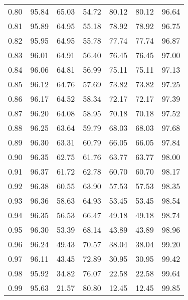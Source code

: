 \begin{tabular}{|c|c|c|c|c|c|c|}
      0.80 &     95.84 &     65.03 &      54.72 &   80.12 &      80.12 &         96.64 \\
      0.81 &     95.89 &     64.95 &      55.18 &   78.92 &      78.92 &         96.75 \\
      0.82 &     95.95 &     64.95 &      55.78 &   77.74 &      77.74 &         96.87 \\
      0.83 &     96.01 &     64.91 &      56.40 &   76.45 &      76.45 &         97.00 \\
      0.84 &     96.06 &     64.81 &      56.99 &   75.11 &      75.11 &         97.13 \\
      0.85 &     96.12 &     64.76 &      57.69 &   73.82 &      73.82 &         97.25 \\
      0.86 &     96.17 &     64.52 &      58.34 &   72.17 &      72.17 &         97.39 \\
      0.87 &     96.20 &     64.08 &      58.95 &   70.18 &      70.18 &         97.52 \\
      0.88 &     96.25 &     63.64 &      59.79 &   68.03 &      68.03 &         97.68 \\
      0.89 &     96.30 &     63.31 &      60.79 &   66.05 &      66.05 &         97.84 \\
      0.90 &     96.35 &     62.75 &      61.76 &   63.77 &      63.77 &         98.00 \\
      0.91 &     96.37 &     61.72 &      62.78 &   60.70 &      60.70 &         98.17 \\
      0.92 &     96.38 &     60.55 &      63.90 &   57.53 &      57.53 &         98.35 \\
      0.93 &     96.36 &     58.63 &      64.93 &   53.45 &      53.45 &         98.54 \\
      0.94 &     96.35 &     56.53 &      66.47 &   49.18 &      49.18 &         98.74 \\
      0.95 &     96.30 &     53.39 &      68.14 &   43.89 &      43.89 &         98.96 \\
      0.96 &     96.24 &     49.43 &      70.57 &   38.04 &      38.04 &         99.20 \\
      0.97 &     96.11 &     43.45 &      72.89 &   30.95 &      30.95 &         99.42 \\
      0.98 &     95.92 &     34.82 &      76.07 &   22.58 &      22.58 &         99.64 \\
      0.99 &     95.63 &     21.57 &      80.80 &   12.45 &      12.45 &         99.85 \\
\bottomrule
\end{tabular}
